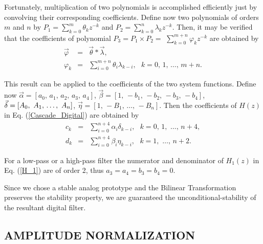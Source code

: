 \documentclass{sebase}
\begin{document}
Fortunately, multiplication of two polynomials is accomplished efficiently
just by convolving their corresponding coefficients. Define now two
polynomials of orders $m$ and $n$ by $P_{1}=\sum_{k=0}^{m}\theta _{k}z^{-k}$
and $P_{2}=\sum_{k=0}^{n}\lambda _{k}z^{-k}$. Then, it may be verified that
the coefficients of polynomial $P_{3}=P_{1}\times P_{2}=$ $%
\sum_{k=0}^{m+n}\varphi _{k}z^{-k}$ are obtained by 
\begin{eqnarray}
\vec{\varphi} &=&\vec{\theta}\ast \vec{\lambda}, \\
\varphi _{k} &=&\sum_{i=0}^{m+n}\theta _{i}\lambda _{k-i},\text{ \ \ \ \ }%
k=0,\,1,\,\ldots ,\,m+n.
\end{eqnarray}

This result can be applied to the coefficients of the two system functions.
Define now $\vec{\alpha}=\left[ a_{0},\,a_{1},\,a_{2},\,a_{3},\,a_{4}\right] 
$, $\vec{\beta}=\left[ 1,\,-b_{1},\,-b_{2},\,-b_{3},\,-b_{4}\right] $, $\vec{%
\delta}=\left[ A_{0},\,\,A_{1},\,\ldots ,\,\,A_{n}\right] $, $\vec{\eta}=%
\left[ 1,\,-B_{1},\,\ldots ,\,-B_{n}\right] $. Then the coefficients of $%
H\left( z\right) $ in Eq. (\ref{Cascade_Digital}) are obtained by 
\begin{eqnarray}
c_{k} &=&\sum_{i=0}^{n+4}\alpha _{i}\delta _{k-i},\text{ \ \ \ \ }%
k=0,\,1,\,\,\ldots ,\,n+4, \\
d_{k} &=&\sum_{i=0}^{n+4}\beta _{i}\eta _{k-i},\text{ \ \ \ \ }%
k=1,\,\,\ldots ,\,n+2.
\end{eqnarray}

\begin{remark}
For a low-pass or a high-pass filter the numerator and denominator of $%
H_{1}\left( z\right) $ in Eq. (\ref{H_1}) are of order 2, thus $%
a_{3}=a_{4}=b_{3}=b_{4}=0.$
\end{remark}

\begin{remark}
Since we chose a stable analog prototype and the Bilinear Transformation
preserves the stability property, we are guaranteed the
unconditional-stability of the resultant digital filter.
\end{remark}

\subsection{AMPLITUDE NORMALIZATION}
\end{document}
